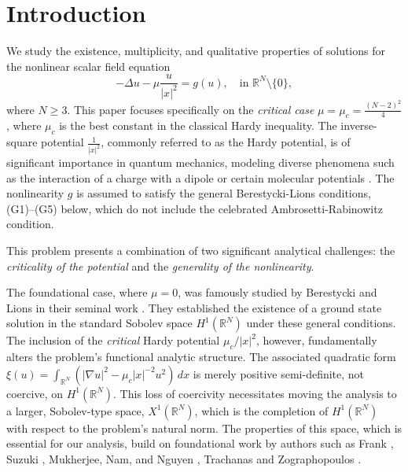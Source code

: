 \documentclass[12pt,leqno,twoside,sort]{amsart}
\newcommand{\R}{\mathbb{R}}
\numberwithin{equation}{section}
\begin{document}
\maketitle

\section{Introduction}

We study the existence, multiplicity, and qualitative properties of solutions for the nonlinear scalar field equation
\begin{equation}\label{eq:intro_main}
-\Delta u - \mu \frac{u}{|x|^2} = g(u), \quad \mbox{in } \R^N \setminus \{0\},
\end{equation}
where $N \geq 3$. This paper focuses specifically on the \textit{critical case} $\mu = \mu_c = \frac{(N-2)^2}{4}$, where $\mu_c$ is the best constant in the classical Hardy inequality. The inverse-square potential $\frac{1}{|x|^2}$, commonly referred to as the Hardy potential, is of significant importance in quantum mechanics, modeling diverse phenomena such as the interaction of a charge with a dipole or certain molecular potentials \cite{Alhaidari2014, Bawin, Case}. The nonlinearity $g$ is assumed to satisfy the general Berestycki-Lions conditions, (G1)--(G5) below, which do not include the celebrated Ambrosetti-Rabinowitz condition.

This problem presents a combination of two significant analytical challenges: the \textit{criticality of the potential} and the \textit{generality of the nonlinearity}.

The foundational case, where $\mu = 0$, was famously studied by Berestycki and Lions in their seminal work \cite{BL}. They established the existence of a ground state solution in the standard Sobolev space $H^1(\R^N)$ under these general conditions. The inclusion of the \textit{critical} Hardy potential $\mu_c / |x|^2$, however, fundamentally alters the problem's functional analytic structure. The associated quadratic form $\xi(u) = \int_{\R^N} (|\nabla u|^2 - \mu_c |x|^{-2} u^2) \, dx$ is merely positive semi-definite, not coercive, on $H^1(\R^N)$. This loss of coercivity necessitates moving the analysis to a larger, Sobolev-type space, $X^1(\R^N)$, which is the completion of $H^1(\R^N)$ with respect to the problem's natural norm. The properties of this space, which is essential for our analysis, build on foundational work by authors such as Frank \cite{Frank}, Suzuki \cite{Suzuki}, Mukherjee, Nam, and Nguyen \cite{Mukherjee}, Trachanas and Zographopoulos \cite{TrachanasZographopoulos, TrachanasZographopoulosCor}.
\end{document}
